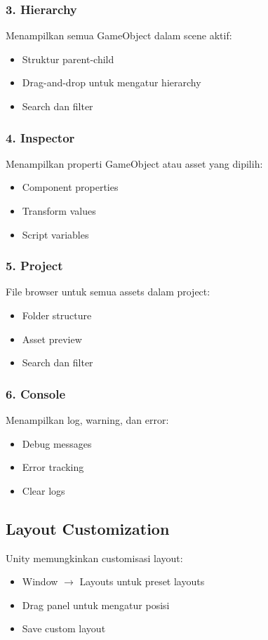 \subsubsection{3. Hierarchy}
Menampilkan semua GameObject dalam scene aktif:
\begin{itemize}
\item Struktur parent-child
\item Drag-and-drop untuk mengatur hierarchy
\item Search dan filter
\end{itemize}

\subsubsection{4. Inspector}
Menampilkan properti GameObject atau asset yang dipilih:
\begin{itemize}
\item Component properties
\item Transform values
\item Script variables
\end{itemize}

\subsubsection{5. Project}
File browser untuk semua assets dalam project:
\begin{itemize}
\item Folder structure
\item Asset preview
\item Search dan filter
\end{itemize}

\subsubsection{6. Console}
Menampilkan log, warning, dan error:
\begin{itemize}
\item Debug messages
\item Error tracking
\item Clear logs
\end{itemize}

\subsection{Layout Customization}

Unity memungkinkan customisasi layout:
\begin{itemize}
\item Window $\rightarrow$ Layouts untuk preset layouts
\item Drag panel untuk mengatur posisi
\item Save custom layout
\end{itemize}

